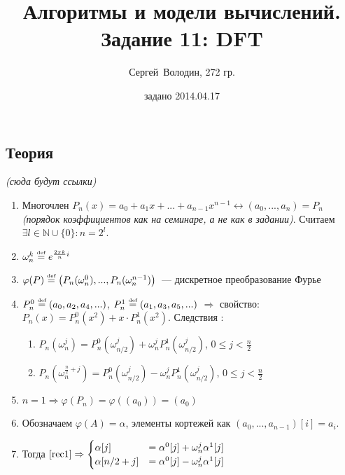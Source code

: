 \documentclass[a4paper]{article}
\date{задано 2014.04.17}
\author{Сергей~Володин, 272 гр.}
\title{Алгоритмы и модели вычислений.\\Задание 11: DFT}
\def\eqdef{\overset{\mbox{\tiny def}}{=}}
\newcommand{\NN}{\mathbb{N}}
\begin{document}
\maketitle
\subsection*{Теория}
{\em(сюда будут ссылки)}
\begin{enumerate}
\item Многочлен $P_n(x)=a_0+a_1x+...+a_{n-1}x^{n-1}\longleftrightarrow (a_0,...,a_n)=P_n$ {\em (порядок коэффициентов как на семинаре, а не как в задании)}. Считаем $\exists l\in\NN\cup\{0\}\colon n=2^l$.
\item $\omega_n^k\eqdef e^{\frac{2\pi k}{n}i}$
\item $\varphi(P)\eqdef \big(P_n(\omega_n^0),...,P_n(\omega_n^{n-1})\big)$~--- дискретное преобразование Фурье
\item $P_n^0\eqdef (a_0,a_2,a_4,...)$, $P_n^1\eqdef (a_1,a_3,a_5,...)$ $\Rightarrow$ свойство: $P_n(x)=P^0_n(x^2)+x\cdot P^1_n(x^2)$. Следствия \label{rec1}:\begin{enumerate}
\item $P_n(\omega_n^j)=P_n^0(\omega_{n/2}^j)+\omega_n^j P_n^1(\omega_{n/2}^j)$, $0\leqslant j<\frac{n}{2}$
\item $P_n(\omega_n^{\frac{n}{2}+j})=P_n^0(\omega_{n/2}^j)- \omega_n^jP_n^1(\omega_{n/2}^j)$, $0\leqslant j < \frac{n}{2}$
\end{enumerate}
\item \label{n1} $n=1\Rightarrow \varphi(P_n)=\varphi((a_0))=(a_0)$ 
\item Обозначаем $\varphi(A)=\alpha$, элементы кортежей как $(a_0,...,a_{n-1})[i]=a_i$.
\item Тогда $\ref{rec1}\Rightarrow\begin{cases}
\alpha[j]&=\alpha^0[j]+\omega_n^j\alpha^1[j]\\
\alpha[n/2+j]&=\alpha^0[j]-\omega_n^j\alpha^1[j]
\end{cases}$
\end{enumerate}
\end{document}
